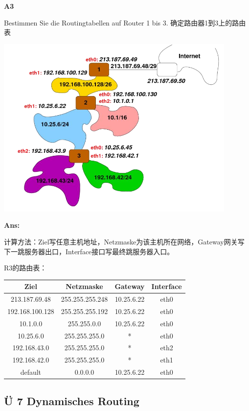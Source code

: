 \documentclass[fleqn]{article}
\begin{document}
\noindent\textbf{A3}

Bestimmen Sie die Routingtabellen auf Router 1 bis 3. 确定路由器1到3上的路由表

\begin{center}
    \includegraphics[scale=0.6]{bild9.png}
\end{center}

\textbf{Ans:}

计算方法：Ziel写任意主机地址，Netzmaske为该主机所在网络，Gateway网关写下一跳服务器出口，Interface接口写最终跳服务器入口。

R3的路由表：
\begin{center}
    \begin{tabular}{c|c|c|c}
        Ziel&Netzmaske&Gateway&Interface\\
        \hline
        213.187.69.48&255.255.255.248&10.25.6.22&eth0\\
        192.168.100.128&255.255.255.192&10.25.6.22&eth0\\
        10.1.0.0&255.255.0.0&10.25.6.22&eth0\\
        10.25.6.0&255.255.255.0&*&eth0\\
        192.168.43.0&255.255.255.0&*&eth2\\
        192.168.42.0&255.255.255.0&*&eth1\\
        default&0.0.0.0&10.25.6.22&eth0
    \end{tabular}
\end{center}

\subsection{Ü 7 Dynamisches Routing}
\end{document}

